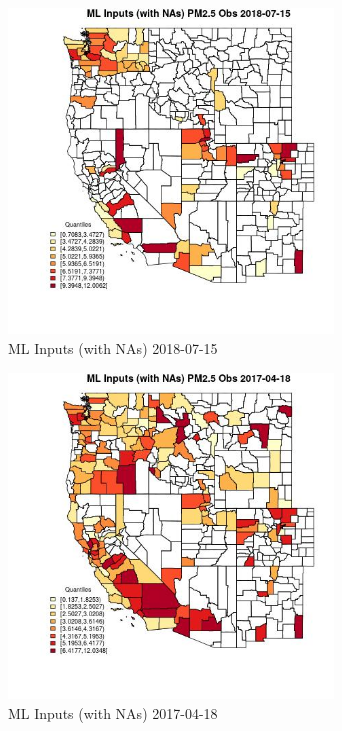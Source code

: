\begin{figure} 
\centering  
\includegraphics[width=0.77\textwidth]{Code_Outputs/Report_ML_input_PM25_Step4_part_e_de_duplicated_aveswNAs_CountyPM25_ObsMean2018-07-15_2018-07-15.jpg} 
\caption{\label{fig:Report_ML_input_PM25_Step4_part_e_de_duplicated_aveswNAsCountyPM25_ObsMean2018-07-15_2018-07-15}ML Inputs (with NAs) 2018-07-15} 
\end{figure} 
 

\begin{figure} 
\centering  
\includegraphics[width=0.77\textwidth]{Code_Outputs/Report_ML_input_PM25_Step4_part_e_de_duplicated_aveswNAs_CountyPM25_ObsMean2017-04-18_2017-04-18.jpg} 
\caption{\label{fig:Report_ML_input_PM25_Step4_part_e_de_duplicated_aveswNAsCountyPM25_ObsMean2017-04-18_2017-04-18}ML Inputs (with NAs) 2017-04-18} 
\end{figure} 
 

